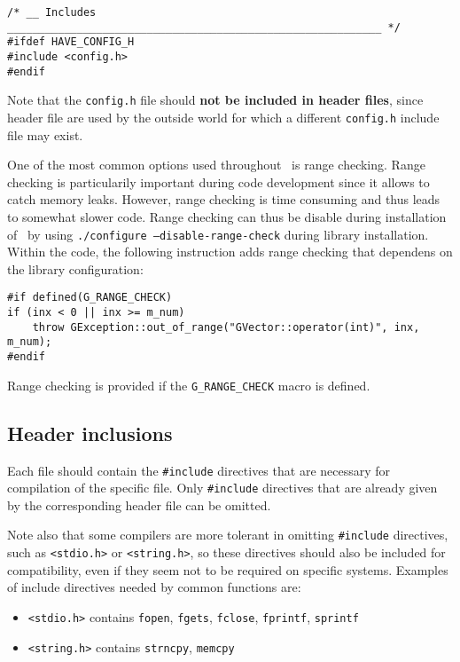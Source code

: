\documentclass{article}[12pt,a4]
\begin{document}
\begin{verbatim}
/* __ Includes ___________________________________________________________ */
#ifdef HAVE_CONFIG_H
#include <config.h>
#endif
\end{verbatim}

Note that the {\tt config.h} file should {\bf not be included in header files}, since header file
are used by the outside world for which a different {\tt config.h} include file may exist.

One of the most common options used throughout \this\ is range checking.
Range checking is particularily important during code development since it allows to catch
memory leaks.
However, range checking is time consuming and thus leads to somewhat slower code.
Range checking can thus be disable during installation of \this\ by using
{\tt ./configure --disable-range-check} during library installation.
Within the code, the following instruction adds range checking that dependens on
the library configuration:

\begin{verbatim}
#if defined(G_RANGE_CHECK)
if (inx < 0 || inx >= m_num)
    throw GException::out_of_range("GVector::operator(int)", inx, m_num);
#endif
\end{verbatim}

Range checking is provided if the {\tt G\_RANGE\_CHECK} macro is defined.


\subsection{Header inclusions}

Each file should contain the {\tt \#include} directives that are necessary for compilation of
the specific file.
Only {\tt \#include} directives that are already given by the corresponding header file can
be omitted.

Note also that some compilers are more tolerant in omitting {\tt \#include} directives, such
as {\tt <stdio.h>} or {\tt <string.h>}, so these directives should also be included for compatibility,
even if they seem not to be required on specific systems.
Examples of include directives needed by common functions are:
\begin{itemize}
\item[] {\tt <stdio.h>} contains {\tt fopen}, {\tt fgets}, {\tt fclose}, {\tt fprintf}, {\tt sprintf}
\item[] {\tt <string.h>} contains {\tt strncpy}, {\tt memcpy}
\end{itemize}
\end{document}
